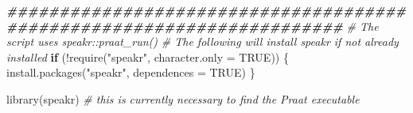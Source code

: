 \documentclass[
]{book}
\newenvironment{Shaded}{\begin{snugshade}}{\end{snugshade}}
\newcommand{\AttributeTok}[1]{\textcolor[rgb]{0.77,0.63,0.00}{#1}}
\newcommand{\CommentTok}[1]{\textcolor[rgb]{0.56,0.35,0.01}{\textit{#1}}}
\newcommand{\ConstantTok}[1]{\textcolor[rgb]{0.00,0.00,0.00}{#1}}
\newcommand{\ControlFlowTok}[1]{\textcolor[rgb]{0.13,0.29,0.53}{\textbf{#1}}}
\newcommand{\DocumentationTok}[1]{\textcolor[rgb]{0.56,0.35,0.01}{\textbf{\textit{#1}}}}
\newcommand{\FunctionTok}[1]{\textcolor[rgb]{0.00,0.00,0.00}{#1}}
\newcommand{\NormalTok}[1]{#1}
\newcommand{\SpecialCharTok}[1]{\textcolor[rgb]{0.00,0.00,0.00}{#1}}
\newcommand{\StringTok}[1]{\textcolor[rgb]{0.31,0.60,0.02}{#1}}
\begin{document}
\begin{Shaded}
\begin{Highlighting}[]
\DocumentationTok{\#\#\#\#\#\#\#\#\#\#\#\#\#\#\#\#\#\#\#\#\#\#\#\#\#\#\#\#\#\#\#\#\#\#\#\#\#\#\#\#\#\#\#\#\#\#\#\#\#\#\#\#\#\#\#\#\#\#\#\#\#\#\#\#\#\#\#\#\#\#}
\CommentTok{\# The script uses speakr::praat\_run()}
\CommentTok{\# The following will install speakr if not already installed}
\ControlFlowTok{if}\NormalTok{ (}\SpecialCharTok{!}\FunctionTok{require}\NormalTok{(}\StringTok{"speakr"}\NormalTok{, }\AttributeTok{character.only =} \ConstantTok{TRUE}\NormalTok{)) \{}
  \FunctionTok{install.packages}\NormalTok{(}\StringTok{"speakr"}\NormalTok{, }\AttributeTok{dependences =} \ConstantTok{TRUE}\NormalTok{)}
\NormalTok{\}}

\FunctionTok{library}\NormalTok{(speakr) }\CommentTok{\# this is currently necessary to find the Praat executable}


\end{Highlighting}
\end{Shaded}
\end{document}
